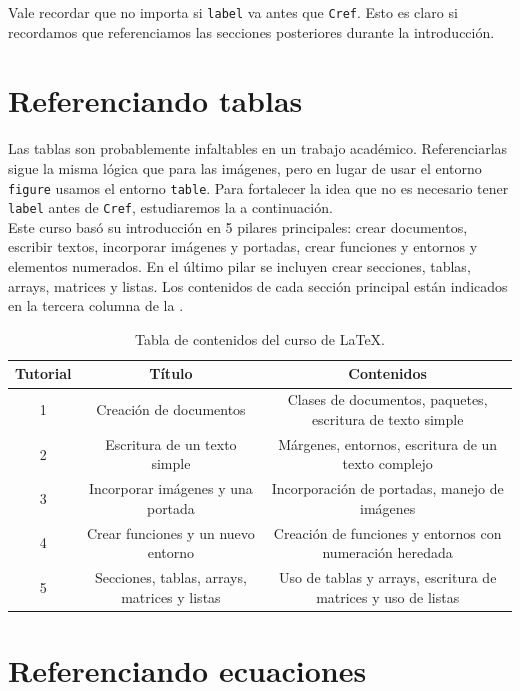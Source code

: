 \documentclass{article}
\begin{document}
Vale recordar que no importa si \texttt{label} va antes que \texttt{Cref}. Esto es claro si recordamos que referenciamos las secciones posteriores durante la introducción.

\section{Referenciando tablas} \label{sec:RefTablas}	

Las tablas son probablemente infaltables en un trabajo académico. Referenciarlas sigue la misma lógica que para las imágenes, pero en lugar de usar el entorno \texttt{figure} usamos el entorno \texttt{table}. Para fortalecer la idea que no es necesario tener \texttt{label} antes de \texttt{Cref}, estudiaremos la  a continuación.\\

Este curso basó su introducción en 5 pilares principales: crear documentos, escribir textos, incorporar imágenes y portadas, crear funciones y entornos y elementos numerados. En el último pilar se incluyen crear secciones, tablas, arrays, matrices y listas. Los contenidos de cada sección principal están indicados en la tercera columna de la . 

\begin{table}[H]
	\centering
	\caption{Tabla de contenidos del curso de \LaTeX.}
	\label{tab:contenidos}
	
	\begin{tabular}{c | c | c}
		Tutorial	&	Título								&	Contenidos	\\ \hline
		1		&	Creación de documentos					&	Clases de documentos, paquetes, escritura de texto simple	\\ \hline
		2		&	Escritura de un texto simple				&	Márgenes, entornos, escritura de un texto complejo				\\ \hline
		3		&	Incorporar imágenes y una portada			&	Incorporación de portadas, manejo de imágenes	\\ \hline
		4		&	Crear funciones y un nuevo entorno			&	Creación de funciones y entornos con numeración heredada	\\ \hline
		5		&	Secciones, tablas, arrays, matrices y listas	&	Uso de tablas y arrays, escritura de matrices y uso de listas
	\end{tabular}
\end{table}

\section{Referenciando ecuaciones} \label{sec:RefEcuaciones}
\end{document}
